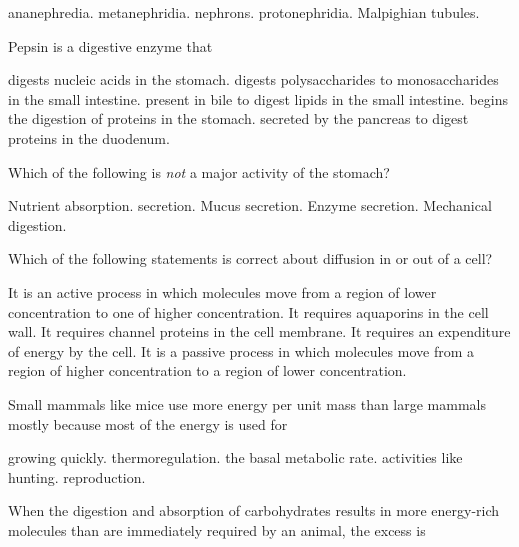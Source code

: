 \begin{choices}
\choice ananephredia. 
\choice metanephridia. 
\choice nephrons. 
\correctchoice protonephridia. 
\choice Malpighian tubules. 
\end{choices}

\question
Pepsin is a digestive enzyme that

\begin{choices}
\choice digests nucleic acids in the stomach. 
\choice digests polysaccharides to monosaccharides in the small intestine. 
\choice present in bile to digest lipids in the small intestine. 
\correctchoice begins the digestion of proteins in the stomach. 
\choice secreted by the pancreas to digest proteins in the duodenum. 
\end{choices}

\question
Which of the following is \emph{not} a major activity of the stomach?

\begin{choices}
\correctchoice Nutrient absorption. 
\choice {} secretion. 
\choice Mucus secretion. 
\choice Enzyme secretion. 
\choice Mechanical digestion. 
\end{choices}

\question
Which of the following statements is correct about diffusion in or out of a cell?

\begin{choices}
\choice It is an active process in which molecules move from a region of lower concentration to one of higher concentration. 
\choice It requires aquaporins in the cell wall. 
\choice It requires channel proteins in the cell membrane. 
\choice It requires an expenditure of energy by the cell. 
\correctchoice It is a passive process in which molecules move from a region of higher concentration to a region of lower concentration. 
\end{choices}

\question
Small mammals like mice use more energy per unit mass than large mammals mostly because most of the energy is used for

\begin{choices}
\choice growing quickly. 
\correctchoice thermoregulation. 
\choice the basal metabolic rate. 
\choice activities like hunting. 
\choice reproduction. 
\end{choices}

\newpage

\question
When the digestion and absorption of carbohydrates results in more energy-rich molecules than are immediately required by an animal, the excess is

